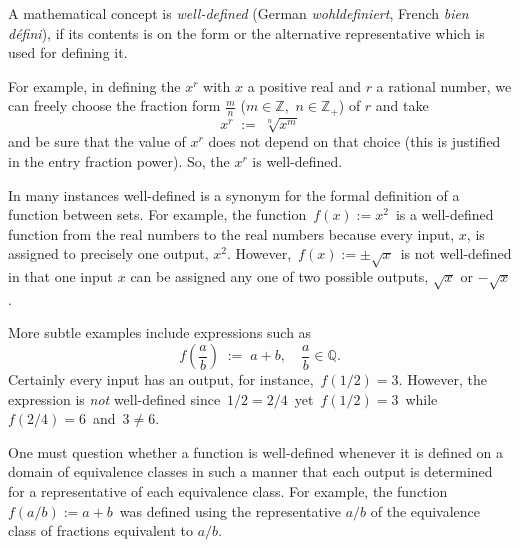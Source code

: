 \documentclass[12pt]{article}
\theoremstyle{definition}
\begin{document}
A mathematical concept is \emph{well-defined} (German {\em wohldefiniert}, French {\em bien d\'efini}), if its contents is 
 on the form or the alternative representative which is used for defining it.  

For example, in defining the  $x^r$ with $x$ a positive real and $r$ a rational number, 
we can freely choose the fraction form $\frac{m}{n}$ ($m\in\mathbb{Z}$,\, $n\in\mathbb{Z}_+$) of $r$ and take 
$$x^r \;:=\; \sqrt[n]{x^m}$$ 
and be sure that the value of $x^r$ does not depend on that choice (this is justified in the entry fraction power).  So, 
the $x^r$ is well-defined.

In many instances well-defined is a synonym for the formal definition of a function between sets.  For example, 
the function\, $f(x) := x^2$\, is a well-defined function from the real numbers to the real numbers because
every input, $x$, is assigned to precisely one output, $x^2$.  However,\, $f(x) := \pm\sqrt{x}$\, is not well-defined
in that one input $x$ can be assigned any one of two possible outputs, $\sqrt{x}$ or $-\sqrt{x}$.

More subtle examples include expressions such as
\begin{equation*}
   f\!\left(\frac{a}{b}\right) \;:=\; a\!+\!b,\quad \frac{a}{b}\in\mathbb{Q}.
\end{equation*}
Certainly every input has an output, for instance,\, $f(1/2) = 3$.  However, the expression is \emph{not}
well-defined since\, $1/2 = 2/4$\, yet\, $f(1/2) = 3$\, while\, $f(2/4) = 6$\, and\, $3 \neq 6$.

One must question whether a function is well-defined whenever it is defined on a domain of equivalence classes 
in such a manner that each output is determined for a representative of each equivalence class.  For example, the
function\, $f(a/b) := a\!+\!b$\, was defined using the representative $a/b$ of the equivalence class of fractions
equivalent to $a/b$.
\end{document}
